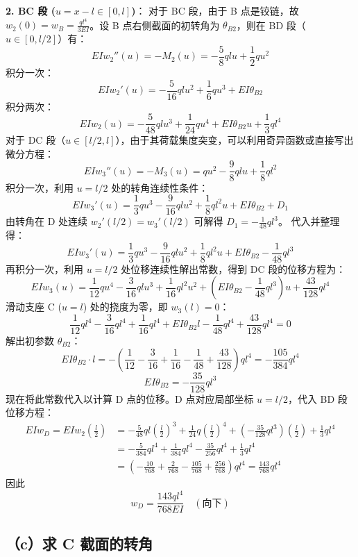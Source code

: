 \documentclass[11pt,a4paper]{ctexrep}
\begin{document}
{\textbf{2. BC 段 ($u = x-l \in [0, l]$)}：
对于 BC 段，由于 B 点是铰链，故 $w_2(0) = w_B = \frac{ql^4}{3EI}$。设 B 点右侧截面的初转角为 $\theta_{B2}$，则在 BD 段（$u \in [0, l/2]$）有：
\[
    EI w_2''(u) = -M_2(u) = -\frac{5}{8} qlu + \frac{1}{2} qu^2
\]
积分一次：
\[
    EI w_2'(u) = -\frac{5}{16} ql u^2 + \frac{1}{6} q u^3 + EI \theta_{B2}
\]
积分两次：
\[
    EI w_2(u) = -\frac{5}{48} ql u^3 + \frac{1}{24} q u^4 + EI \theta_{B2} u + \frac{1}{3} ql^4
\]
对于 DC 段（$u \in [l/2, l]$），由于其荷载集度突变，可以利用奇异函数或直接写出微分方程：
\[
    EI w_3''(u) = -M_3(u) = qu^2 - \frac{9}{8} qlu + \frac{1}{8} ql^2
\]
积分一次，利用 $u=l/2$ 处的转角连续性条件：
\[
    EI w_3'(u) = \frac{1}{3} q u^3 - \frac{9}{16} ql u^2 + \frac{1}{8} ql^2 u + EI \theta_{B2} + D_1
\]
由转角在 D 处连续 $w_2'(l/2) = w_3'(l/2)$ 可解得 $D_1 = -\frac{1}{48} ql^3$。
代入并整理得：
\[
    EI w_3'(u) = \frac{1}{3} q u^3 - \frac{9}{16} ql u^2 + \frac{1}{8} ql^2 u + EI \theta_{B2} - \frac{1}{48} ql^3
\]
再积分一次，利用 $u=l/2$ 处位移连续性解出常数，得到 DC 段的位移方程为：
\[
    EI w_3(u) = \frac{1}{12} q u^4 - \frac{3}{16} ql u^3 + \frac{1}{16} ql^2 u^2 + \left(EI\theta_{B2} - \frac{1}{48}ql^3\right) u + \frac{43}{128} ql^4
\]
滑动支座 C ($u=l$) 处的挠度为零，即 $w_3(l) = 0$：
\[
    \frac{1}{12} q l^4 - \frac{3}{16} q l^4 + \frac{1}{16} q l^4 + EI \theta_{B2} l - \frac{1}{48} ql^4 + \frac{43}{128} ql^4 = 0
\]
解出初参数 $\theta_{B2}$：
\[
    EI \theta_{B2} \cdot l = - \left( \frac{1}{12} - \frac{3}{16} + \frac{1}{16} - \frac{1}{48} + \frac{43}{128} \right) ql^4 = - \frac{105}{384} ql^4
\]
\[
    EI \theta_{B2} = -\frac{35}{128} ql^3
\]
现在将此常数代入以计算 D 点的位移。D 点对应局部坐标 $u = l/2$，代入 BD 段位移方程：
\[
    \begin{aligned}
        EI w_D = EI w_2\left(\frac{l}{2}\right) &= -\frac{5}{48} ql \left(\frac{l}{2}\right)^3 + \frac{1}{24} q \left(\frac{l}{2}\right)^4 + \left(-\frac{35}{128} ql^3\right) \left(\frac{l}{2}\right) + \frac{1}{3} ql^4 \\
        &= -\frac{5}{384} ql^4 + \frac{1}{384} ql^4 - \frac{35}{256} ql^4 + \frac{1}{3} ql^4 \\
        &= \left( -\frac{10}{768} + \frac{2}{768} - \frac{105}{768} + \frac{256}{768} \right) ql^4 = \frac{143}{768} ql^4
    \end{aligned}
\]
因此
\[
    w_D = \frac{143ql^4}{768EI} \quad (\text{向下})
\]

\subsection*{（c）求 C 截面的转角}

}
\end{document}
